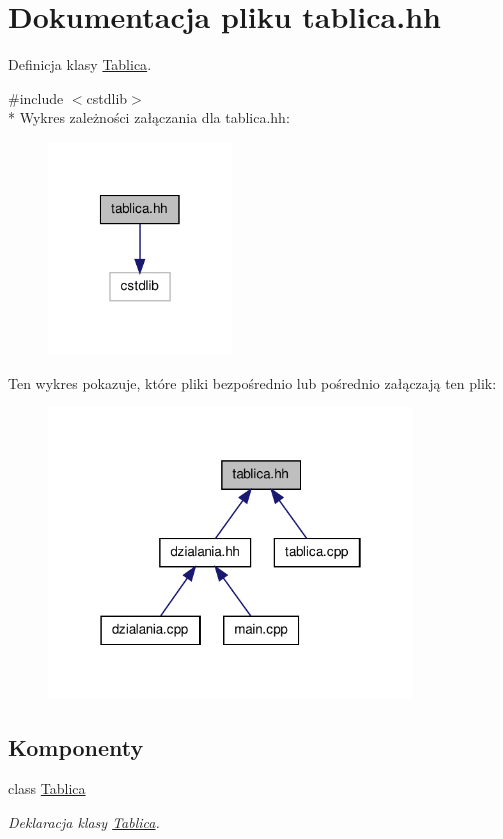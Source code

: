 \hypertarget{tablica_8hh}{\section{Dokumentacja pliku tablica.\-hh}
\label{tablica_8hh}
}


Definicja klasy \hyperlink{class_tablica}{Tablica}.  


{\ttfamily \#include $<$cstdlib$>$}\\*
Wykres zależności załączania dla tablica.\-hh\-:\nopagebreak
\begin{figure}[H]
\begin{center}
\leavevmode
\includegraphics[width=138pt]{tablica_8hh__incl}
\end{center}
\end{figure}
Ten wykres pokazuje, które pliki bezpośrednio lub pośrednio załączają ten plik\-:\nopagebreak
\begin{figure}[H]
\begin{center}
\leavevmode
\includegraphics[width=274pt]{tablica_8hh__dep__incl}
\end{center}
\end{figure}
\subsection*{Komponenty}
\begin{DoxyCompactItemize}
\item 
class \hyperlink{class_tablica}{Tablica}
\begin{DoxyCompactList}\small\item\em Deklaracja klasy \hyperlink{class_tablica}{Tablica}. \end{DoxyCompactList}\end{DoxyCompactItemize}
